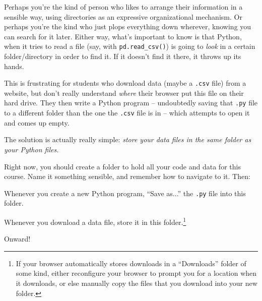 
Perhaps you're the kind of person who likes to arrange their information in a
sensible way, using directories as an expressive organizational mechanism. Or
perhaps you're the kind who just plops everything down wherever, knowing you
can search for it later. Either way, what's important to know is that Python,
when it tries to read a file (say, with \texttt{pd.read\_csv()}) is going to
\textit{look} in a certain folder/directory in order to find it. If it doesn't
find it there, it throws up its hands.

This is frustrating for students who download data (maybe a \texttt{.csv} file)
from a website, but don't really understand \textit{where} their browser put
this file on their hard drive. They then write a Python program -- undoubtedly
saving that \texttt{.py} file to a different folder than the one the
\texttt{.csv} file is in -- which attempts to open it and comes up empty.

The solution is actually really simple: \textit{store your data files in the
same folder as your Python files.}

Right now, you should create a folder to hold all your code and data for this
course. Name it something sensible, and remember how to navigate to it. Then:

\begin{compactitem}

\item[\leftthumbsup] Whenever you create a new Python program, ``Save as...''
the \texttt{.py} file into this folder.

\item[\leftthumbsup] Whenever you download a data file, store it in this
folder.\footnote{If your browser automatically stores downloads in a
``Downloads'' folder of some kind, either reconfigure your browser to prompt
you for a location when it downloads, or else manually copy the files that you
download into your new folder.}

\end{compactitem}

Onward!
